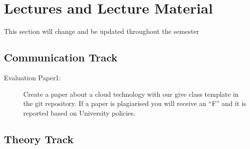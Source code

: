 \section{Lectures and Lecture Material}

\begin{WARNING}
This section will change and be updated throughout the semester
\end{WARNING}

\subsection{Communication Track}




\begin{description}
\item[Evaluation Paper1:] Create a paper about a cloud technology with
  our give class template in the git repository. If a paper is
  plagiarised you will receive an ``F'' and it is reported based on
  University policies.
\end{description}


\subsection{Theory Track}

